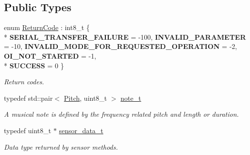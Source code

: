 \subsection*{Public Types}
\begin{DoxyCompactItemize}
\item 
\hypertarget{classroomba_1_1series500_1_1oi_1_1_o_i_encoder_ac2c8ad2f0306050926f89882d74696cc}{enum \hyperlink{classroomba_1_1series500_1_1oi_1_1_o_i_encoder_ac2c8ad2f0306050926f89882d74696cc}{Return\+Code} \+: int8\+\_\+t \{ \\*
{\bfseries S\+E\+R\+I\+A\+L\+\_\+\+T\+R\+A\+N\+S\+F\+E\+R\+\_\+\+F\+A\+I\+L\+U\+R\+E} = -\/100, 
{\bfseries I\+N\+V\+A\+L\+I\+D\+\_\+\+P\+A\+R\+A\+M\+E\+T\+E\+R} = -\/10, 
{\bfseries I\+N\+V\+A\+L\+I\+D\+\_\+\+M\+O\+D\+E\+\_\+\+F\+O\+R\+\_\+\+R\+E\+Q\+U\+E\+S\+T\+E\+D\+\_\+\+O\+P\+E\+R\+A\+T\+I\+O\+N} = -\/2, 
{\bfseries O\+I\+\_\+\+N\+O\+T\+\_\+\+S\+T\+A\+R\+T\+E\+D} = -\/1, 
\\*
{\bfseries S\+U\+C\+C\+E\+S\+S} = 0
 \}}\label{classroomba_1_1series500_1_1oi_1_1_o_i_encoder_ac2c8ad2f0306050926f89882d74696cc}

\begin{DoxyCompactList}\small\item\em Return codes. \end{DoxyCompactList}\item 
typedef std\+::pair$<$ \hyperlink{namespaceroomba_1_1series500_1_1oi_a1a8bf7d79627d7b145a833e43b8cd214}{Pitch}, uint8\+\_\+t $>$ \hyperlink{classroomba_1_1series500_1_1oi_1_1_o_i_encoder_ab4b7bf89bb873d838512791e339694fd}{note\+\_\+t}
\begin{DoxyCompactList}\small\item\em A musical note is defined by the frequency related pitch and length or duration. \end{DoxyCompactList}\item 
typedef uint8\+\_\+t $\ast$ \hyperlink{classroomba_1_1series500_1_1oi_1_1_o_i_encoder_a19ddaf411fb6201dde68dd359932992b}{sensor\+\_\+data\+\_\+t}
\begin{DoxyCompactList}\small\item\em Data type returned by sensor methods. \end{DoxyCompactList}\end{DoxyCompactItemize}
